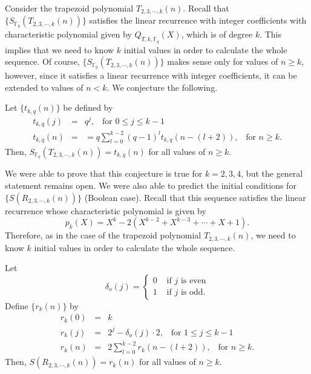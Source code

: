 Consider the trapezoid polynomial $T_{2,3,\cdots,k}(n)$. Recall that $\{S_{\mathbb{F}_q}(T_{2,3,\cdots,k}(n))\}$ satisfies the linear recurrence with integer coefficients with characteristic polynomial 
given by $Q_{T,k,\mathbb{F}_q}(X)$, which is of degree $k$.  This implies that we need to know $k$ initial values in order to calculate the whole sequence.  Of course, $\{S_{\mathbb{F}_q}(T_{2,3,\cdots,k}(n))\}$
makes sense only for values of $n\geq k$, however, since it satisfies a linear recurrence with integer coefficients, it can be extended to values of $n<k$.  We conjecture the following.
\begin{conjecture}
\label{trapconj}
 Let $\{t_{k,q}(n)\}$ be defined by 
 \begin{eqnarray}
  t_{k,q}(j) &=& q^j,\,\,\, \text{ for }0\leq j \leq k-1\\\nonumber
  t_{k,q}(n) &=& =q \sum _{l=0}^{k-2} (q-1)^l t_{k,q}(n-(l+2)), \,\,\, \text{ for }n\geq k.
 \end{eqnarray}
Then, $S_{\mathbb{F}_q}(T_{2,3,\cdots,k}(n)) = t_{k,q}(n)$ for all values of $n\geq k$.
\end{conjecture}
We were able to prove that this conjecture is true for $k=2,3,4$, but the general statement remains open.  We were also able to predict the initial conditions for $\{S(R_{2,3,\cdots, k}(n))\}$ (Boolean case). Recall that this sequence satisfies the linear recurrence whose characteristic polynomial is given by
\begin{equation}
 p_k(X)=X^k -2 (X^{k-2}+X^{k-3}+\cdots+X+1).
\end{equation}
Therefore, as in the case of the trapezoid polynomial $T_{2,3,\cdots,k}(n)$, we need to know $k$ initial values in order to calculate the whole sequence.
\begin{conjecture}
\label{rotconj}
Let
\begin{equation}
\delta_o(j) =\begin{cases}
 0 & \text{ if }j \text{ is even} \\
 1 & \text{ if }j \text{ is odd.}
\end{cases}
\end{equation}
Define $\{r_{k}(n)\}$ by 
 \begin{eqnarray}
  r_k(0)&=& k\\\nonumber
  r_k(j)&=& 2^j-\delta_o(j)\cdot 2,\,\,\, \text{ for }1\leq j\leq k-1\\\nonumber
  r_k(n)&=& 2\sum_{l=0}^{k-2} r_k(n-(l+2)), \,\,\, \text{ for }n\geq k.
 \end{eqnarray}
Then, $S(R_{2,3,\cdots,k}(n)) = r_{k}(n)$ for all values of $n\geq k$.
\end{conjecture}

